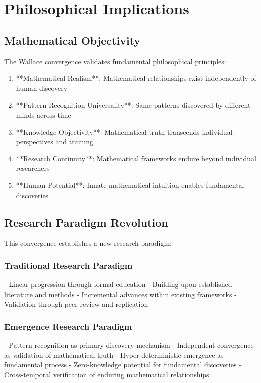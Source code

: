 \section{Philosophical Implications}

\subsection{Mathematical Objectivity}

The Wallace convergence validates fundamental philosophical principles:

\begin{enumerate}
    \item **Mathematical Realism**: Mathematical relationships exist independently of human discovery
    \item **Pattern Recognition Universality**: Same patterns discovered by different minds across time
    \item **Knowledge Objectivity**: Mathematical truth transcends individual perspectives and training
    \item **Research Continuity**: Mathematical frameworks endure beyond individual researchers
    \item **Human Potential**: Innate mathematical intuition enables fundamental discoveries
\end{enumerate}

\subsection{Research Paradigm Revolution}

This convergence establishes a new research paradigm:

\subsubsection{Traditional Research Paradigm}
- Linear progression through formal education
- Building upon established literature and methods
- Incremental advances within existing frameworks
- Validation through peer review and replication

\subsubsection{Emergence Research Paradigm}
- Pattern recognition as primary discovery mechanism
- Independent convergence as validation of mathematical truth
- Hyper-deterministic emergence as fundamental process
- Zero-knowledge potential for fundamental discoveries
- Cross-temporal verification of enduring mathematical relationships

